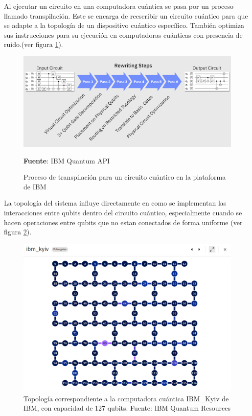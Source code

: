 \documentclass[letterpaper,12pt]{thesisECFM}
\theoremstyle{plain}
\theoremstyle{definition}
\theoremstyle{definition}
\theoremstyle{remark}
\newcommand{\1}{\mathbb{1}}
\begin{document}
Al ejecutar un circuito en una computadora cuántica se pasa por un proceso llamado transpilación. Este se encarga de reescribir un circuito cuántico para que se adapte a la topología de un dispositivo cuántico específico. También optimiza sus instrucciones para su ejecución en computadoras cuánticas con presencia de ruido.(ver figura \ref{fig:transpiling}). 
\begin{figure}[h]
    \centering
    \includegraphics[scale=0.15]{imagenes/transpiling_core_steps.png}
    \caption{Proceso de transpilación para un circuito cuántico en la plataforma de IBM} \textbf{Fuente}: IBM Quantum API \cite{ibm_quantum_api}
    \label{fig:transpiling}
\end{figure}
La topología del sistema influye directamente en como se implementan las interacciones entre qubits dentro del circuito cuántico, especialmente cuando se hacen operaciones entre qubits que no estan conectados de forma uniforme (ver figura \ref{fig:topos}). 
\begin{figure}[h]
    \centering
    \includegraphics[scale=0.5]{imagenes/topo_ibm_kyiv.png}
    \caption{Topología correspondiente a la computadora cuántica IBM\_Kyiv de IBM, con capacidad de 127 qubits. Fuente: IBM Quantum Resources \cite{ibm_quantum_resources}}
    \label{fig:topos}
\end{figure}
\end{document}
